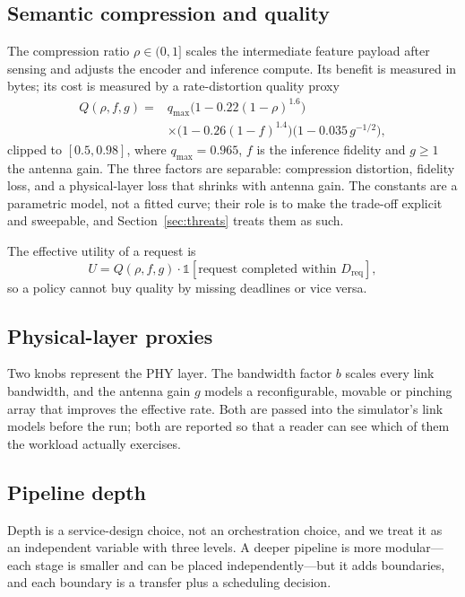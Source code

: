 \documentclass[journal,10pt]{IEEEtran}
\begin{document}
\subsection{Semantic compression and quality}
The compression ratio $\rho\in(0,1]$ scales the intermediate feature payload
after sensing and adjusts the encoder and inference compute. Its benefit is
measured in bytes; its cost is measured by a rate-distortion quality proxy
\begin{equation}
\begin{aligned}
Q(\rho,f,g)={}&q_{\max}\bigl(1-0.22(1-\rho)^{1.6}\bigr)\\
&\times\bigl(1-0.26(1-f)^{1.4}\bigr)
 \bigl(1-0.035\,g^{-1/2}\bigr),
\end{aligned}
\label{eq:quality}
\end{equation}
clipped to $[0.5,0.98]$, where $q_{\max}=0.965$, $f$ is the inference fidelity
and $g\ge1$ the antenna gain. The three factors are separable: compression
distortion, fidelity loss, and a physical-layer loss that shrinks with antenna
gain. The constants are a parametric model, not a fitted curve; their role is
to make the trade-off explicit and sweepable, and Section~\ref{sec:threats}
treats them as such.

The effective utility of a request is
\begin{equation}
U=Q(\rho,f,g)\cdot\mathbb{1}[\text{request completed within }D_{\text{req}}],
\label{eq:utility}
\end{equation}
so a policy cannot buy quality by missing deadlines or vice versa.

\subsection{Physical-layer proxies}
Two knobs represent the PHY layer. The bandwidth factor $b$ scales every link
bandwidth, and the antenna gain $g$ models a reconfigurable, movable or
pinching array that improves the effective rate. Both are passed into the
simulator's link models before the run; both are reported so that a reader can
see which of them the workload actually exercises.

\subsection{Pipeline depth}
Depth is a service-design choice, not an orchestration choice, and we treat it
as an independent variable with three levels. A deeper pipeline is more
modular---each stage is smaller and can be placed independently---but it adds
boundaries, and each boundary is a transfer plus a scheduling decision.
\end{document}

